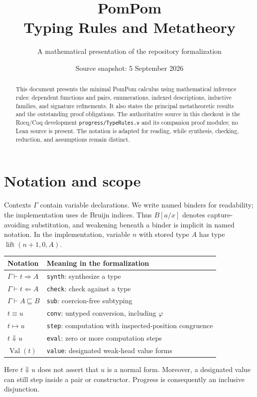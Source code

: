\documentclass[11pt,a4paper]{article}
\title{PomPom\\[3mm]\Large Typing Rules and Metatheory}
\author{A mathematical presentation of the repository formalization}
\date{Source snapshot: 5 September 2026}
\newcommand{\sy}[3]{#1\vdash #2\Rightarrow #3}
\newcommand{\chk}[3]{#1\vdash #2\Leftarrow #3}
\newcommand{\sub}[3]{#1\vdash #2\sqsubseteq #3}
\theoremstyle{definition}\newtheorem{definition}[theorem]{Definition}
\begin{document}
\maketitle
\begin{abstract}
This document presents the minimal PomPom calculus using mathematical inference rules: dependent functions and pairs, enumerations, indexed descriptions, inductive families, and signature refinements. It also states the principal metatheoretic results and the outstanding proof obligations. The authoritative source in this checkout is the Rocq/Coq development \texttt{progress/TypeRules.v} and its companion proof modules; no Lean source is present. The notation is adapted for reading, while synthesis, checking, reduction, and assumptions remain distinct.
\end{abstract}
\setcounter{tocdepth}{1}
\tableofcontents
\newpage
\section{Notation and scope}
Contexts $\Gamma$ contain variable declarations. We write named binders for readability; the implementation uses de Bruijn indices. Thus $B[a/x]$ denotes capture-avoiding substitution, and weakening beneath a binder is implicit in named notation. In the implementation, variable $n$ with stored type $A$ has type $\operatorname{lift}(n+1,0,A)$.
\begin{center}
\begin{tabular}{ll}
\toprule
Notation & Meaning in the formalization\\\midrule
$\sy{\Gamma}{t}{A}$ & \texttt{synth}: synthesize a type\\
$\chk{\Gamma}{t}{A}$ & \texttt{check}: check against a type\\
$\sub{\Gamma}{A}{B}$ & \texttt{sub}: coercion-free subtyping\\
$t\equiv u$ & \texttt{conv}: untyped conversion, including $\varphi$\\
$t\longmapsto u$ & \texttt{step}: computation with inspected-position congruence\\
$t\Downarrow u$ & \texttt{eval}: zero or more computation steps\\
$\operatorname{Val}(t)$ & \texttt{value}: designated weak-head value forms\\
\bottomrule
\end{tabular}
\end{center}
Here $t\Downarrow u$ does not assert that $u$ is a normal form. Moreover, a designated value can still step inside a pair or constructor. Progress is consequently an inclusive disjunction.
\end{document}
